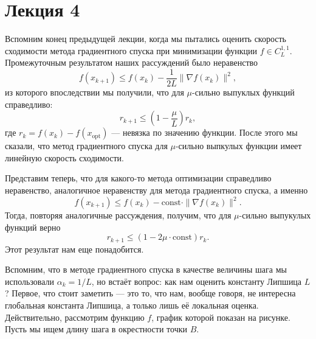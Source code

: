\documentclass[a4paper, 12pt]{article}
\begin{document}

\section{Лекция 4}

Вспомним конец предыдущей лекции, когда мы пытались оценить скорость сходимости метода градиентного спуска при минимизации функции $f \in C^{1, 1}_{L}$. Промежуточным результатом наших рассуждений было неравенство
$$f(x_{k+1}) \leq f(x_k) - \frac{1}{2L}\|\nabla f(x_k)\|^2,$$
из которого впоследствии мы получили, что для $\mu$-сильно выпуклых функций справедливо:
$$r_{k+1} \leq \left(1 - \frac{\mu}{L}\right)r_k,$$
где $r_k = f(x_k) - f(x_{\text{opt}})$ --- невязка по значению функции. После этого мы сказали, что метод градиентного спуска для $\mu$-сильно выпкулых функции имеет линейную скорость сходимости. 

Представим теперь, что для какого-то метода оптимизации справедливо неравенство, аналогичное неравенству для метода градиентного спуска, а именно
$$f(x_{k+1}) \leq f(x_k) - \mathrm{const} \cdot \|\nabla f(x_k)\|^2.$$
Тогда, повторяя аналогичные рассуждения, получим, что для $\mu$-сильно выпукулых функций верно
$$r_{k + 1} \leq (1 - 2\mu \cdot  \mathrm{const})r_k.$$
Этот результат нам еще понадобится.

Вспомним, что в методе градиентного спуска в качестве величины шага мы использовали $\alpha_k = 1/L$, но встаёт вопрос: как нам оценить константу Липшица $L$? Первое, что стоит заметить --- это то, что нам, вообще говоря, не интересна глобальная константа Липшица, а только лишь её локальная оценка. Действительно, рассмотрим функцию $f$, график которой показан на рисунке. Пусть мы ищем длину шага в окрестности точки $B$.
 
\begin{center}
\end{center}
\end{document}
